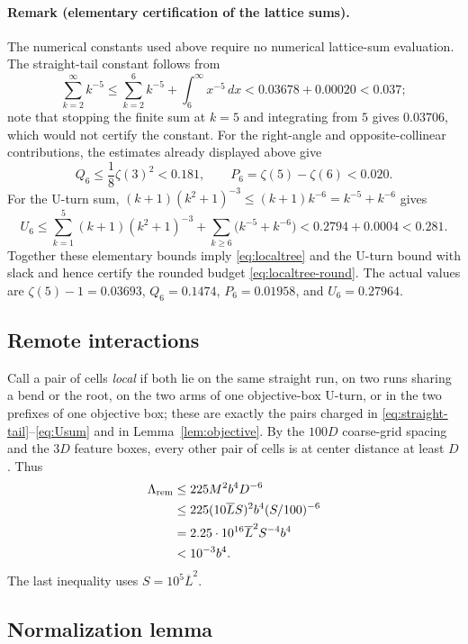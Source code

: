\documentclass[12pt,a4paper]{article}
\begin{document}
\paragraph{Remark (elementary certification of the lattice sums).}
The numerical constants used above require no numerical lattice-sum evaluation.  The straight-tail constant follows from
\[
 \sum_{k=2}^\infty k^{-5}
 \le \sum_{k=2}^{6} k^{-5}+\int_6^\infty x^{-5}\,dx
 <0.03678+0.00020
 <0.037;
\]
note that stopping the finite sum at $k=5$ and integrating from $5$ gives $0.03706$, which would not certify the constant.  For the right-angle and opposite-collinear contributions, the estimates already displayed above give
\[
 Q_6\le \frac18\zeta(3)^2<0.181,
 \qquad
 P_6=\zeta(5)-\zeta(6)<0.020.
\]
For the U-turn sum, $(k+1)(k^2+1)^{-3}\le(k+1)k^{-6}=k^{-5}+k^{-6}$ gives
\[
 U_6\le\sum_{k=1}^{5}(k+1)(k^2+1)^{-3}+\sum_{k\ge6}\bigl(k^{-5}+k^{-6}\bigr)
 <0.2794+0.0004<0.281.
\]
Together these elementary bounds imply \eqref{eq:localtree} and the U-turn bound with slack and hence certify the rounded budget \eqref{eq:localtree-round}.  The actual values are $\zeta(5)-1=0.03693$, $Q_6=0.1474$, $P_6=0.01958$, and $U_6=0.27964$.

\subsection{Remote interactions}\label{sec:remote}

Call a pair of cells \emph{local} if both lie on the same straight run, on two runs sharing a bend or the root, on the two arms of one objective-box U-turn, or in the two prefixes of one objective box; these are exactly the pairs charged in \eqref{eq:straight-tail}--\eqref{eq:Usum} and in Lemma~\ref{lem:objective}.  By the $100D$ coarse-grid spacing and the $3D$ feature boxes, every other pair of cells is at center distance at least $D$.  Thus
\begin{align}
 \Lambda_{\rm rem}
 &\le225M^2b^4D^{-6}\nonumber\\
 &\le225(10\overline LS)^2b^4(S/100)^{-6}\nonumber\\
 &=2.25\cdot10^{16}\overline L^2S^{-4}b^4\nonumber\\
 &<10^{-3}b^4.\label{eq:remote}
\end{align}
The last inequality uses $S=10^5\overline L^2$.

\subsection{Normalization lemma}
\end{document}
